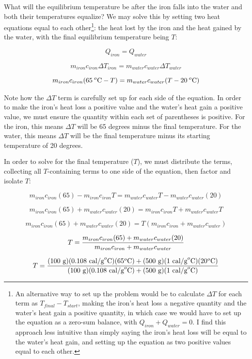\filbreak

What will the equilibrium temperature be after the iron falls into the water and both their temperatures equalize?  We may solve this by setting two heat equations equal to each other\footnote{An alternative way to set up the problem would be to calculate $\Delta T$ for each term as $T_{final} - T_{start}$, making the iron's heat loss a negative quantity and the water's heat gain a positive quantity, in which case we would have to set up the equation as a zero-sum balance, with $Q_{iron} + Q_{water} = 0$.  I find this approach less intuitive than simply saying the iron's heat loss will be equal to the water's heat gain, and setting up the equation as two positive values equal to each other.}: the heat lost by the iron and the heat gained by the water, with the final equilibrium temperature being $T$:

$$Q_{iron} = Q_{water}$$

$$m_{iron}c_{iron} \Delta T_{iron} = m_{water}c_{water} \Delta T_{water}$$

$$m_{iron}c_{iron} (65 \> ^o\hbox{C} - T) = m_{water}c_{water} (T - 20 \> ^o\hbox{C})$$

Note how the $\Delta T$ term is carefully set up for each side of the equation.  In order to make the iron's heat loss a positive value and the water's heat gain a positive value, we must ensure the quantity within each set of parentheses is positive.  For the iron, this means $\Delta T$ will be 65 degrees minus the final temperature.  For the water, this means $\Delta T$ will be the final temperature minus its starting temperature of 20 degrees.  

In order to solve for the final temperature ($T$), we must distribute the terms, collecting all $T$-containing terms to one side of the equation, then factor and isolate $T$:

$$m_{iron}c_{iron}(65) - m_{iron}c_{iron}T = m_{water}c_{water}T - m_{water}c_{water}(20)$$

$$m_{iron}c_{iron}(65) + m_{water}c_{water}(20) = m_{iron}c_{iron}T + m_{water}c_{water}T $$

$$m_{iron}c_{iron}(65) + m_{water}c_{water}(20) = T(m_{iron}c_{iron} + m_{water}c_{water}) $$

$$T = {{m_{iron}c_{iron}(65) + m_{water}c_{water}(20)} \over {m_{iron}c_{iron} + m_{water}c_{water}}}$$

$$T = {{(100 \hbox{ g})(0.108 \hbox{ cal/g}^o\hbox{C})(65^o\hbox{C}) + (500 \hbox{ g})(1 \hbox{ cal/g}^o\hbox{C})(20^o\hbox{C})} \over {(100 \hbox{ g})(0.108 \hbox{ cal/g}^o\hbox{C}) + (500 \hbox{ g})(1 \hbox{ cal/g}^o\hbox{C})}}$$

